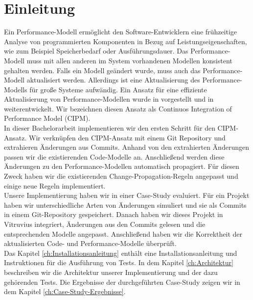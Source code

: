 \chapter{Einleitung}
\label{ch:Einleitung}

Ein Performance-Modell ermöglicht den Software-Entwicklern eine frühzeitige Analyse von programmierten Komponenten in Bezug auf Leistungseigenschaften, wie zum Beispiel Speicherbedarf oder Ausführungsdauer. Das Performance-Modell muss mit allen anderen im System vorhandenen Modellen konsistent gehalten werden. Falls ein Modell geändert wurde, muss auch das Performance-Modell aktualisiert werden. Allerdings ist eine Aktualisierung des Performance-Modells für große Systeme aufwändig. Ein Ansatz für eine effiziente Aktualisierung von Performance-Modellen wurde in \cite{mazkatli2018} vorgestellt und in \cite{mazkatli2020} weiterentwickelt. Wir bezeichnen diesen Ansatz als Continuos Integration of Performance Model (CIPM). 
\\
In dieser Bachelorarbeit implementieren wir den ersten Schritt für den CIPM-Ansatz. Wir verknüpfen den CIPM-Ansatz mit einem Git Repository und extrahieren Änderungen aus Commits. Anhand von den extrahierten Änderungen passen wir die existierenden Code-Modelle an. Anschließend werden diese Änderungen zu den Performance-Modellen automatisch propagiert. Für diesen Zweck haben wir die existierenden Change-Propagation-Regeln angepasst und einige neue Regeln implementiert.
\\ 
Unsere Implementierung haben wir in einer Case-Study evaluiert. Für ein Projekt haben wir unterschiedliche Arten von Änderungen simuliert und sie als Commits in einem Git-Repository gespeichert. Danach haben wir dieses Projekt in Vitruvius integriert, Änderungen aus den Commits gelesen und die entsprechenden Modelle angepasst. Anschließend haben wir die Korrektheit der aktualisierten Code- und Performance-Modelle überprüft.
\\
Das Kapitel \ref{ch:Installationsanleitung} enthält eine Installationsanleitung und Instruktionen für die Ausführung von Tests. In dem Kapitel \ref{ch:Architektur} beschreiben wir die Architektur unserer Implementierung und der dazu gehörenden Tests. Die Ergebnisse der durchgeführten Case-Study zeigen wir in dem Kapitel \ref{ch:Case-Study-Ergebnisse}.
